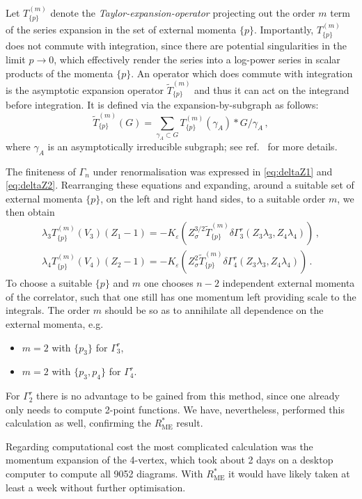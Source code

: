 \documentclass[a4paper,11pt]{article}
\begin{document}
Let $T^{(m)}_{\{p\}}$ denote the \emph{Taylor-expansion-operator} projecting out the order $m$ term of the series expansion in the set of external momenta $\{p\}$. Importantly, $T^{(m)}_{\{p\}}$ does not commute with integration, since there are potential singularities in the limit $p\to 0 $, which effectively render the series into a log-power series in scalar products of the momenta $\{p\}$. 
An operator which does commute with integration is the asymptotic expansion operator $\widetilde {T}^{(m)}_{\{p\}}$ and thus it can act on the integrand before integration. It is defined via the expansion-by-subgraph as follows:
\begin{equation}
\widetilde {T}^{(m)}_{\{p\}}(G)=\sum_{\gamma_A \subset G} T^{(m)}_{\{p\}}(\gamma_A)* G/\gamma_A\,,
\end{equation}
where $\gamma_A$ is an asymptotically irreducible subgraph; see ref.~\cite{Smirnov:2002pj,Chakraborty:2024uzz} for more details. 

The finiteness of $\Gamma_{n}$ under renormalisation was expressed in \eqref{eq:deltaZ1} and \eqref{eq:deltaZ2}. Rearranging these equations and expanding, around a suitable set of external momenta $\{p\}$, on the left and right hand sides, to a suitable order $m$, we then obtain
\begin{align}
  \lambda_3 T^{(m)}_{\{p\}}(V_3)  (Z_1-1) = - K_\varepsilon \left( Z^{3/2}_\sigma \widetilde T^{(m)}_{\{p\}}\delta \Gamma_3^r(Z_3\lambda_3,Z_4\lambda_4)\right)\,,\\
\lambda_4 T^{(m)}_{\{p\}}(V_4)  (Z_2-1) = -K_\varepsilon \left( Z^{2}_\sigma \widetilde T^{(m)}_{\{p\}} \delta \Gamma_4^r(Z_3\lambda_3,Z_4\lambda_4)\right)\,.
\end{align}
To choose a suitable $\{p\}$ and $m$ one chooses $n-2$ independent external momenta of the correlator, such that one still has one momentum left providing scale to the integrals. The order $m$ should be so as to annihilate all dependence on the external momenta, e.g.
\begin{itemize}
    \item $m=2$ with $\{p_3\}$ for $\Gamma_3^r$, 
    \item $m=2$ with $\{p_3,p_4\}$ for $\Gamma_4^r$.
\end{itemize}
For $\Gamma_2^r$ there is no advantage to be gained from this method, since one already only needs to compute 2-point functions. We have, nevertheless, performed this calculation as well, confirming the $R^*_\textrm{ME}$ result. 

Regarding computational cost the most complicated calculation was the momentum expansion of the 4-vertex, which took about 2 days on a desktop computer to compute all 9052 diagrams. With $R^*_{\textrm{ME}}$ it would have likely taken at least a week without further optimisation.
\end{document}
